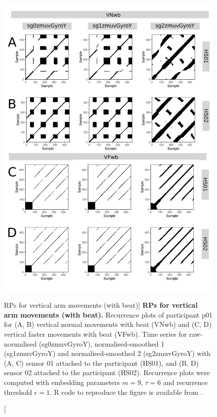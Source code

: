 \begin{figure}
\centering
\includegraphics[height=0.8\textheight]{rps_Vwb_w500}
\caption
	[RPs for vertical arm movements (with beat)]{
	{\bf RPs for vertical arm movements (with beat).}	
	Recurrence plots of participant p01 for 
	(A, B) vertical normal movements with beat (VNwb) and
	(C, D) vertical faster movements with beat (VFwb).
	Time series for raw-normalised (sg0zmuvGyroY), 
	normalised-smoothed 1 (sg1zmuvGyroY) and 
	normalised-smoothed 2 (sg2zmuvGyroY) with
	(A, C) sensor 01 attached to the participant (HS01), and
	(B, D) sensor 02 attached to the participant (HS02).
	Recurrence plots were computed with 
	embedding parameters $m=9$, $\tau=6$ and 
	recurrence threshold $\epsilon=1$.
	R code to reproduce the figure is available from \cite{hwum2018}.
        }
    \label{fig:rps_Vwb_w500}
\end{figure}






